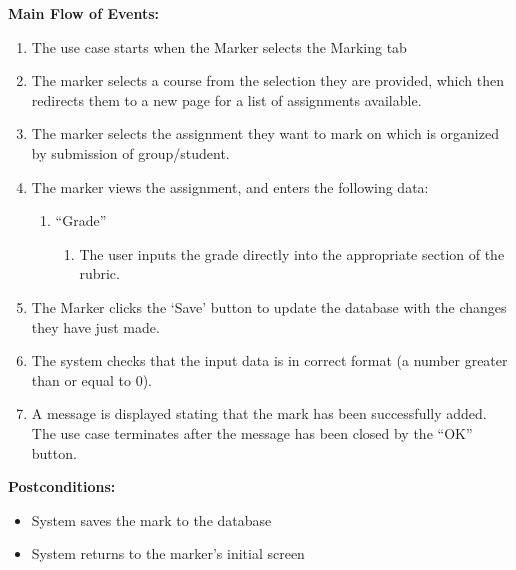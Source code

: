 \documentclass{article}
\begin{document}
\textbf{Main Flow of Events:}
\begin{enumerate}
\item The use case starts when the Marker selects the Marking tab
\item The marker selects a course from the selection they are provided, which then redirects them to a new page for a list of assignments available.
\item The marker selects the assignment they want to mark on which is organized by submission of group/student. 
\item The marker views the assignment, and enters the following data:
	\begin {enumerate}
	\item “Grade”
		\begin {enumerate}
			\item  The user inputs the grade directly into the appropriate section of the rubric.
		\end {enumerate}
	\end {enumerate}
\item The Marker clicks the ‘Save’ button to update the database with the changes they have just made.
\item The system checks that the input data is in correct format (a number greater than or equal to 0).
\item A message is displayed stating that the mark has been successfully added.
The use case terminates after the message has been closed by the “OK” button.
\end {enumerate}

\textbf{Postconditions:}
\begin{itemize}
\item System saves the mark to the database
\item System returns to the marker’s initial screen
\end {itemize}
\end{document}
